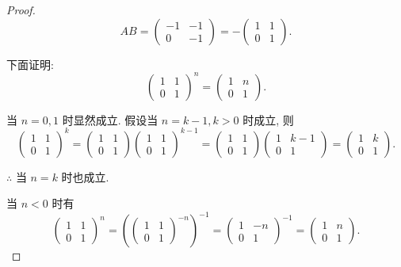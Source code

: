 \documentclass[color=black,device=normal,lang=cn,mode=geye]{elegantnote}
\begin{document}
\begin{proof}
    \[AB=\begin{pmatrix}
        -1 & -1 \\
        0 & -1
    \end{pmatrix}=-\begin{pmatrix}
        1 & 1 \\
        0 & 1
    \end{pmatrix}.\]
    
    下面证明:
    \[\begin{pmatrix}
        1 & 1 \\
        0 & 1
    \end{pmatrix}^n=\begin{pmatrix}
        1 & n \\
        0 & 1
    \end{pmatrix}.\]
    
    当 $n=0,1$ 时显然成立. 假设当 $n=k-1,k>0$ 时成立, 则
    \[\begin{pmatrix}
        1 & 1 \\
        0 & 1
    \end{pmatrix}^k=\begin{pmatrix}
        1 & 1 \\
        0 & 1
    \end{pmatrix}\begin{pmatrix}
        1 & 1 \\
        0 & 1
    \end{pmatrix}^{k-1}=\begin{pmatrix}
        1 & 1 \\
        0 & 1
    \end{pmatrix}\begin{pmatrix}
        1 & k-1 \\
        0 & 1
    \end{pmatrix}=\begin{pmatrix}
        1 & k \\
        0 & 1
    \end{pmatrix}.\]
    
    $\therefore$ 当 $n=k$ 时也成立.
    
    当 $n<0$ 时有
    \[\begin{pmatrix}
        1 & 1 \\
        0 & 1
    \end{pmatrix}^n=\left(\begin{pmatrix}
        1 & 1 \\
        0 & 1
    \end{pmatrix}^{-n}\right)^{-1}=\begin{pmatrix}
        1 & -n \\
        0 & 1
    \end{pmatrix}^{-1}=\begin{pmatrix}
        1 & n \\
        0 & 1
    \end{pmatrix}.\]
    

\end{proof}
\end{document}
